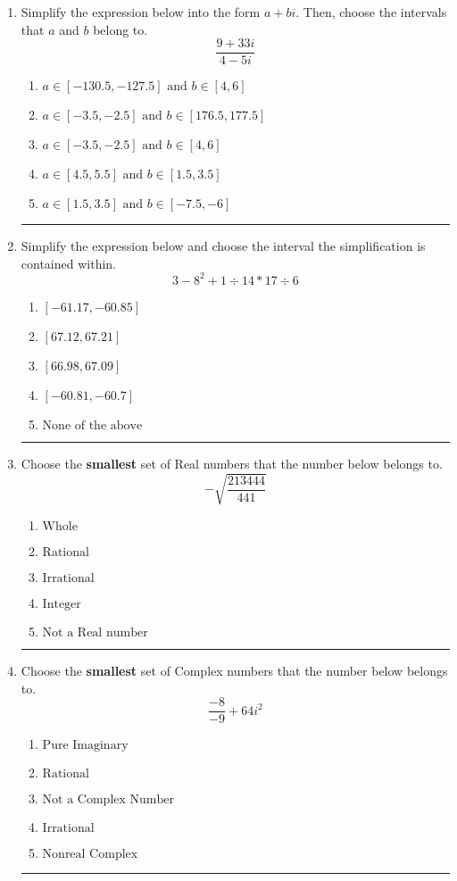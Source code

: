 \documentclass[14pt]{extbook}
\newcommand{\litem}[1]{\item#1\hspace*{-1cm}\rule{\textwidth}{0.4pt}}
\begin{document}
\begin{enumerate}
{\begin{enumerate}[label=\Alph*.]
\end{enumerate} }
\litem{
Simplify the expression below into the form $a+bi$. Then, choose the intervals that $a$ and $b$ belong to.\[ \frac{9 + 33 i}{4 - 5 i} \]\begin{enumerate}[label=\Alph*.]
\item \( a \in [-130.5, -127.5] \text{ and } b \in [4, 6] \)
\item \( a \in [-3.5, -2.5] \text{ and } b \in [176.5, 177.5] \)
\item \( a \in [-3.5, -2.5] \text{ and } b \in [4, 6] \)
\item \( a \in [4.5, 5.5] \text{ and } b \in [1.5, 3.5] \)
\item \( a \in [1.5, 3.5] \text{ and } b \in [-7.5, -6] \)

\end{enumerate} }
\litem{
Simplify the expression below and choose the interval the simplification is contained within.\[ 3 - 8^2 + 1 \div 14 * 17 \div 6 \]\begin{enumerate}[label=\Alph*.]
\item \( [-61.17, -60.85] \)
\item \( [67.12, 67.21] \)
\item \( [66.98, 67.09] \)
\item \( [-60.81, -60.7] \)
\item \( \text{None of the above} \)

\end{enumerate} }
\litem{
Choose the \textbf{smallest} set of Real numbers that the number below belongs to.\[ -\sqrt{\frac{213444}{441}} \]\begin{enumerate}[label=\Alph*.]
\item \( \text{Whole} \)
\item \( \text{Rational} \)
\item \( \text{Irrational} \)
\item \( \text{Integer} \)
\item \( \text{Not a Real number} \)

\end{enumerate} }
\litem{
Choose the \textbf{smallest} set of Complex numbers that the number below belongs to.\[ \frac{-8}{-9}+64i^2 \]\begin{enumerate}[label=\Alph*.]
\item \( \text{Pure Imaginary} \)
\item \( \text{Rational} \)
\item \( \text{Not a Complex Number} \)
\item \( \text{Irrational} \)
\item \( \text{Nonreal Complex} \)


\end{enumerate}}
\end{enumerate}
\end{document}
